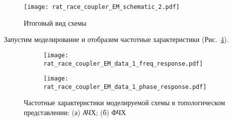 \begin{figure}[p]
    \centering
    \texttt{[image: rat\_race\_coupler\_EM\_schematic\_2.pdf]}
    \caption{Итоговый вид схемы}%
    \label{fig:rat_race_coupler_EM_schematic_2}
\end{figure}

Запустим моделирование и отобразим частотные характеристики (Рис.~\ref{fig:rat_race_coupler_EM_data_1}).

\begin{figure}[!ht]
    \centering
    \begin{subfigure}[b]{0.45\textwidth}
        \centering
        \texttt{[image: rat\_race\_coupler\_EM\_data\_1\_freq\_response.pdf]}
        \caption{}%
    \label{fig:rat_race_coupler_EM_data_1_freq_response}
    \end{subfigure}
    \hfill
    \begin{subfigure}[b]{0.45\textwidth}
        \centering
        \texttt{[image: rat\_race\_coupler\_EM\_data\_1\_phase\_response.pdf]}
        \caption{}%
    \label{fig:rat_race_coupler_EM_data_1_phase_response}
    \end{subfigure}
    \caption{%
        Частотные характеристики моделируемой схемы в топологическом представлении:
        (а) АЧХ;
        (б) ФЧХ
    }%
    \label{fig:rat_race_coupler_EM_data_1}
\end{figure}
